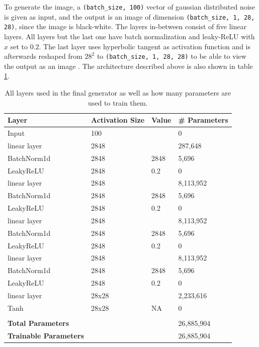 \documentclass[12pt, fleqn, titlepage]{article}
\begin{document}
To generate the image, a \texttt{(batch\_size, 100)} vector of gaussian distributed noise is given as input, and the output is an image of dimension \texttt{(batch\_size, 1, 28, 28)}, since the image is black-white. The layers in-between consist of five linear layers. All layers but the last one have batch normalization and leaky-ReLU with $x$ set to $0.2$. The last layer uses hyperbolic tangent as activation function and is afterwards reshaped from $28^2$ to \texttt{(batch\_size, 1, 28, 28)} to be able to view the output as an image \cite{pathmind_gen_disc_architecture}. The architecture described above is also shown in table \ref{tab:gan_generator}.

\begin{table}[H]
	\centering
	\begin{tabular}{llll}\toprule
		Layer                        & Activation Size & Value & \# Parameters\\ \midrule
		Input                        & 100             &       & 0            \\
		linear layer                 & 2848            &       & 287,648      \\
		BatchNorm1d                  & 2848            & 2848  & 5,696        \\
		LeakyReLU                    & 2848            & 0.2   & 0            \\
		linear layer                 & 2848            &       & 8,113,952    \\
		BatchNorm1d                  & 2848            & 2848  & 5,696        \\
		LeakyReLU                    & 2848            & 0.2   & 0            \\
		linear layer                 & 2848            &       & 8,113,952    \\
		BatchNorm1d                  & 2848            & 2848  & 5,696        \\
		LeakyReLU                    & 2848            & 0.2   & 0            \\
		linear layer                 & 2848            &       & 8,113,952    \\
		BatchNorm1d                  & 2848            & 2848  & 5,696        \\
		LeakyReLU                    & 2848            & 0.2   & 0            \\
		linear layer                 & 28x28           &       & 2,233,616    \\
		Tanh                         & 28x28           & NA    & 0            \\
		                             &                 &       &              \\
		\textbf{Total Parameters}    &                 &       & 26,885,904   \\
		\textbf{Trainable Parameters}&                 &       & 26,885,904   \\  \bottomrule
	\end{tabular}
	\caption{All layers used in the final generator as well as how many parameters are used to train them.}
	\label{tab:gan_generator}
\end{table}
\end{document}
